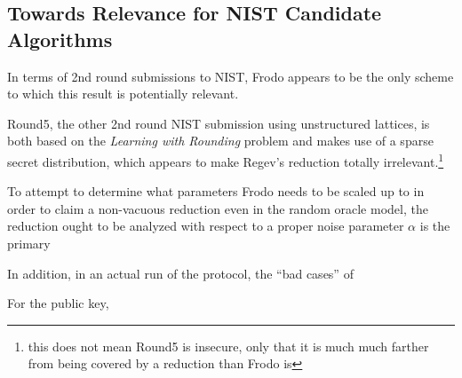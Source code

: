 \subsection{Towards Relevance for NIST Candidate Algorithms}
\label{sec:towards-relev-nist}

In terms of 2nd round submissions to NIST, Frodo appears to be the
only scheme to which this result is potentially relevant.

Round5, the
  other 2nd round NIST submission using unstructured lattices, is both
  based on the \emph{Learning with Rounding} problem and makes use of
  a sparse secret distribution, which appears to make Regev's
  reduction totally irrelevant.\footnote{this does not mean Round5 is
    insecure, only that it is much much farther from being covered by
    a reduction than Frodo is}

To attempt to determine what parameters Frodo needs to be scaled up to
in order to claim a non-vacuous reduction even in the random oracle
model, the reduction ought to be analyzed with respect to a proper
noise parameter $\alpha$ is the primary 



In addition, in an actual run of the protocol, the ``bad cases'' of  

For the public key, 

